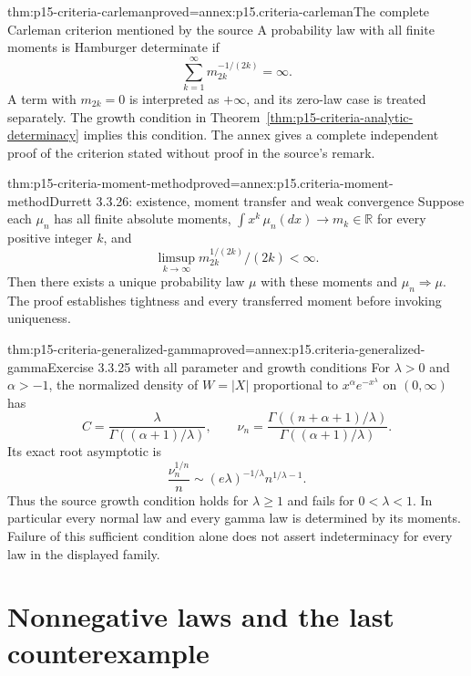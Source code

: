 \begin{hbtheorem}{thm:p15-criteria-carleman}{proved=annex:p15.criteria-carleman}{The complete Carleman criterion mentioned by the source}
A probability law with all finite moments is Hamburger
determinate if
\[
 \sum_{k=1}^\infty m_{2k}^{-1/(2k)}=\infty.
\]
A term with \(m_{2k}=0\) is interpreted as \(+\infty\),
and its zero-law case is treated separately.
The growth condition in Theorem~\ref{thm:p15-criteria-analytic-determinacy}
implies this condition.
The annex gives a complete independent proof of the
criterion stated without proof in the source's remark.
\end{hbtheorem}

\begin{hbtheorem}{thm:p15-criteria-moment-method}{proved=annex:p15.criteria-moment-method}{Durrett 3.3.26: existence, moment transfer and weak convergence}
Suppose each \(\mu_n\) has all finite absolute moments,
\(\int x^k\,\mu_n(dx)\to m_k\in\mathbb R\) for every
positive integer \(k\), and
\[
 \limsup_{k\to\infty}m_{2k}^{1/(2k)}/(2k)<\infty.
\]
Then there exists a unique probability law \(\mu\) with
these moments and \(\mu_n\Rightarrow\mu\).
The proof establishes tightness and every transferred
moment before invoking uniqueness.
\end{hbtheorem}

\begin{hbtheorem}{thm:p15-criteria-generalized-gamma}{proved=annex:p15.criteria-generalized-gamma}{Exercise 3.3.25 with all parameter and growth conditions}
For \(\lambda>0\) and \(\alpha>-1\), the normalized density
of \(W=|X|\) proportional to \(x^\alpha e^{-x^\lambda}\)
on \((0,\infty)\) has
\[
 C=\frac{\lambda}{\Gamma((\alpha+1)/\lambda)},\qquad
 \nu_n=\frac{\Gamma((n+\alpha+1)/\lambda)}
                  {\Gamma((\alpha+1)/\lambda)}.
\]
Its exact root asymptotic is
\[
 \frac{\nu_n^{1/n}}n
       \sim(e\lambda)^{-1/\lambda}n^{1/\lambda-1}.
\]
Thus the source growth condition holds for \(\lambda\geq1\)
and fails for \(0<\lambda<1\).
In particular every normal law and every gamma law is
determined by its moments. Failure of this sufficient
condition alone does not assert indeterminacy for every
law in the displayed family.
\end{hbtheorem}

\section{Nonnegative laws and the last counterexample}
\label{sec:p15-criteria-stieltjes}

